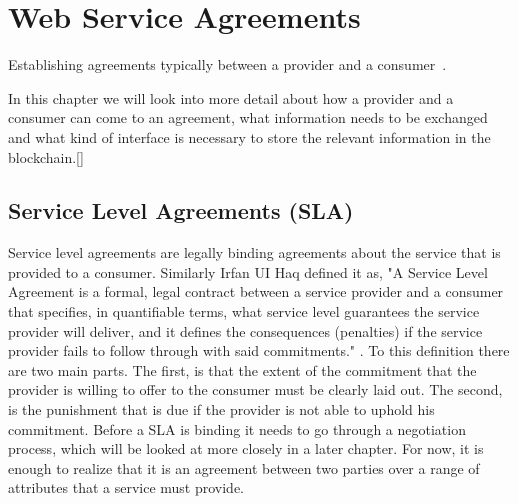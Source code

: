 \chapter{Web Service Agreements}

\begin{center}
  \begin{minipage}{0.5\textwidth}
    \begin{small}
      Establishing agreements typically between a provider and a consumer~\cite{andrieux2007web}.
    \end{small}
  \end{minipage}
  \vspace{0.5cm}
\end{center}

In this chapter we will look into more detail about how a provider and a consumer can come to an agreement, what information needs to be exchanged and what kind of interface is necessary to store the relevant information in the blockchain.[]

\section{Service Level Agreements (SLA)}
Service level agreements are legally binding agreements about the service that is provided to a consumer. Similarly Irfan UI Haq defined it as, "A Service Level Agreement is a formal, legal contract between a service provider and a consumer that specifies, in quantifiable terms, what service level guarantees the service provider will deliver, and it defines the consequences (penalties) if the service provider fails to follow through with said commitments." \cite{TODO PHD THESISIRFAN}. To this definition there are two main parts. The first, is that the extent of the commitment that the provider is willing to offer to the consumer must be clearly laid out. The second, is the punishment that is due if the provider is not able to uphold his commitment. Before a SLA is binding it needs to go through a negotiation process, which will be looked at more closely in a later chapter. For now, it is enough to realize that it is an agreement between two parties over a range of attributes that a service must provide.

